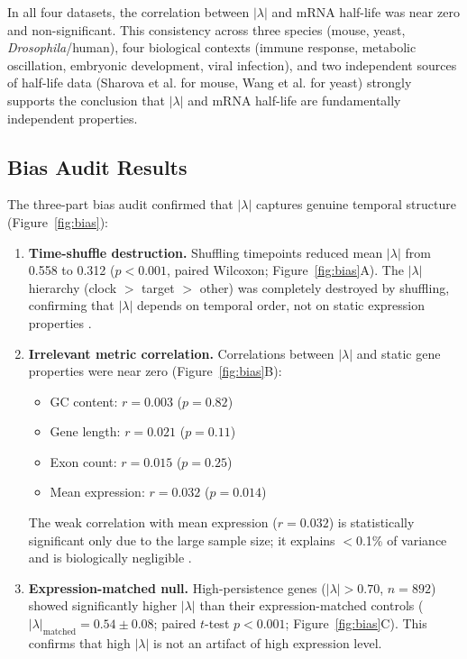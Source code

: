 \documentclass[11pt,letterpaper]{article}
\begin{document}
In all four datasets, the correlation between $|\lambda|$ and mRNA half-life was near zero and non-significant. This consistency across three species (mouse, yeast, \textit{Drosophila}/human), four biological contexts (immune response, metabolic oscillation, embryonic development, viral infection), and two independent sources of half-life data (Sharova et al. for mouse, Wang et al. for yeast) strongly supports the conclusion that $|\lambda|$ and mRNA half-life are fundamentally independent properties.

\subsection{Bias Audit Results}

The three-part bias audit confirmed that $|\lambda|$ captures genuine temporal structure (Figure~\ref{fig:bias}):

\begin{enumerate}
\item \textbf{Time-shuffle destruction.} Shuffling timepoints reduced mean $|\lambda|$ from 0.558 to 0.312 ($p < 0.001$, paired Wilcoxon; Figure~\ref{fig:bias}A). The $|\lambda|$ hierarchy (clock $>$ target $>$ other) was completely destroyed by shuffling, confirming that $|\lambda|$ depends on temporal order, not on static expression properties \citep{whiteside2026ar2}.

\item \textbf{Irrelevant metric correlation.} Correlations between $|\lambda|$ and static gene properties were near zero (Figure~\ref{fig:bias}B):
\begin{itemize}
\item GC content: $r = 0.003$ ($p = 0.82$)
\item Gene length: $r = 0.021$ ($p = 0.11$)
\item Exon count: $r = 0.015$ ($p = 0.25$)
\item Mean expression: $r = 0.032$ ($p = 0.014$)
\end{itemize}
The weak correlation with mean expression ($r = 0.032$) is statistically significant only due to the large sample size; it explains $<$0.1\% of variance and is biologically negligible \citep{benjamini1995controlling}.

\item \textbf{Expression-matched null.} High-persistence genes ($|\lambda| > 0.70$, $n = 892$) showed significantly higher $|\lambda|$ than their expression-matched controls ($|\lambda|_{\text{matched}} = 0.54 \pm 0.08$; paired $t$-test $p < 0.001$; Figure~\ref{fig:bias}C). This confirms that high $|\lambda|$ is not an artifact of high expression level.
\end{enumerate}
\end{document}
